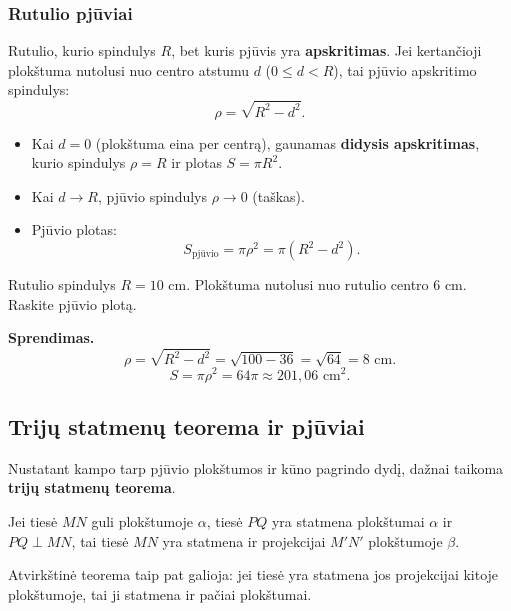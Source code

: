 \subsubsection{Rutulio pjūviai}

\begin{definition}
Rutulio, kurio spindulys $R$, bet kuris pjūvis yra \textbf{apskritimas}. Jei kertančioji plokštuma nutolusi nuo centro atstumu $d$ ($0 \leq d < R$), tai pjūvio apskritimo spindulys:
\[
\rho = \sqrt{R^2 - d^2}.
\]
\end{definition}

\begin{itemize}
    \item Kai $d = 0$ (plokštuma eina per centrą), gaunamas \textbf{didysis apskritimas}, kurio spindulys $\rho = R$ ir plotas $S = \pi R^2$.
    \item Kai $d \to R$, pjūvio spindulys $\rho \to 0$ (taškas).
    \item Pjūvio plotas:
    \[
    S_{\text{pjūvio}} = \pi \rho^2 = \pi(R^2 - d^2).
    \]
\end{itemize}

\begin{example}
Rutulio spindulys $R = 10$ cm. Plokštuma nutolusi nuo rutulio centro 6 cm. Raskite pjūvio plotą.

\textbf{Sprendimas.}
\[
\rho = \sqrt{R^2 - d^2} = \sqrt{100 - 36} = \sqrt{64} = 8 \text{ cm}.
\]
\[
S = \pi\rho^2 = 64\pi \approx 201{,}06 \text{ cm}^2.
\]
\end{example}

\subsection{Trijų statmenų teorema ir pjūviai}

Nustatant kampo tarp pjūvio plokštumos ir kūno pagrindo dydį, dažnai taikoma \textbf{trijų statmenų teorema}.

\begin{theorem}
Jei tiesė $MN$ guli plokštumoje $\alpha$, tiesė $PQ$ yra statmena plokštumai $\alpha$ ir $PQ \perp MN$, tai tiesė $MN$ yra statmena ir projekcijai $M'N'$ plokštumoje $\beta$.
\end{theorem}

\begin{remark}
Atvirkštinė teorema taip pat galioja: jei tiesė yra statmena jos projekcijai kitoje plokštumoje, tai ji statmena ir pačiai plokštumai.
\end{remark}

